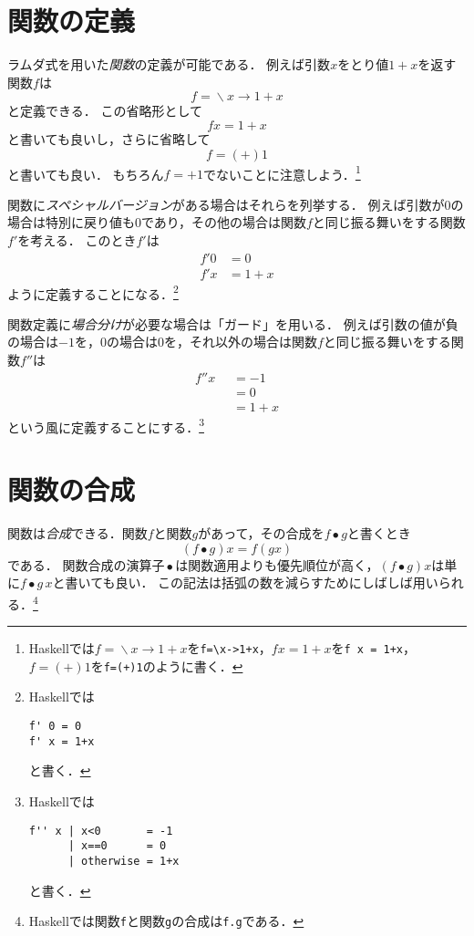 \documentclass[twocolumn]{jsbook}
\newcommand{\mathKeyword}[1]{\mathbf{#1}}
\DeclareMathOperator{\mathCompose}{\bullet}
\DeclareMathOperator{\mathLambda}{\backslash}
\newcommand{\mathOtherwise}{\mathKeyword{otherwise}}
\newcommand{\mathGuard}[1]{\mathop{\mid_{#1}}}
\newcommand{\mathLambdaExpression}[2]{\mathLambda#1\rightarrow#2}
\newcommand{\keyword}[1]{\emph{#1}}
\newcommand{\code}[1]{\texttt{#1}}
\begin{document}
\section{関数の定義}

ラムダ式を用いた\keyword{関数}の定義が可能である．
例えば引数$x$をとり値$1+x$を返す関数$f$は$$f=\mathLambdaExpression{x}{1+x}$$と定義できる．
この省略形として$$fx=1+x$$と書いても良いし，さらに省略して$$f=(+)1$$と書いても良い．
もちろん$f=+1$でないことに注意しよう．\footnote{Haskellでは$f=\mathLambdaExpression{x}{1+x}$を\code{f=\textbackslash x->1+x}，$fx=1+x$を\code{f x = 1+x}，$f=(+)1$を\code{f=(+)1}のように書く．}

関数に\keyword{スペシャルバージョン}がある場合はそれらを列挙する．
例えば引数が$0$の場合は特別に戻り値も$0$であり，その他の場合は関数$f$と同じ振る舞いをする関数$f'$を考える．
このとき$f'$は
\begin{equation*}
\begin{split}
f'0&=0\\
f'x&=1+x
\end{split}
\end{equation*}
ように定義することになる．\footnote{Haskellでは
\begin{verbatim}
f' 0 = 0
f' x = 1+x
\end{verbatim}
と書く．}

関数定義に\keyword{場合分け}が必要な場合は「ガード」を用いる．
例えば引数の値が負の場合は$-1$を，$0$の場合は$0$を，それ以外の場合は関数$f$と同じ振る舞いをする関数$f''$は
\begin{equation*}
\begin{split}
f''x&\mathGuard{x<0}=-1\\
&\mathGuard{x\equiv 0}=0\\
&\mathGuard{\mathOtherwise}=1+x
\end{split}
\end{equation*}
という風に定義することにする．\footnote{Haskellでは
\begin{verbatim}
f'' x | x<0       = -1
      | x==0      = 0
      | otherwise = 1+x
\end{verbatim}
と書く．}

\section{関数の合成}

関数は\keyword{合成}できる．関数$f$と関数$g$があって，その合成を$f\mathCompose g$と書くとき$$(f\mathCompose g)x=f(gx)$$である．
関数合成の演算子$\mathCompose$は関数適用よりも優先順位が高く，$(f\mathCompose g)x$は単に$f\mathCompose g\,x$と書いても良い．
この記法は括弧の数を減らすためにしばしば用いられる．\footnote{Haskellでは関数\code{f}と関数\code{g}の合成は\code{f.g}である．}
\end{document}
